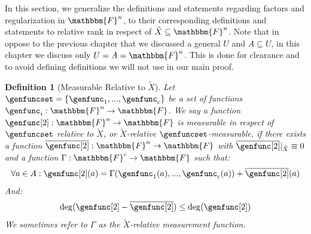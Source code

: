 \documentclass[10pt,a4paper]{article}
\newtheorem{definition}[theorem]{Definition}
\newcommand{\set}[1]{\left\{ #1 \right\}}
\newcommand{\basefield}[0]{\mathbbm{F}}
\newcommand{\blocklength}[0]{n}
\newcommand{\field}[0]{\basefield^{\blocklength}}
\newcommand{\funcdef}[3]{#1:#2\rightarrow#3}
\newcommand{\restrictfunc}[2]{#1|_{#2}}
\newcommand{\relativeremainder}[1]{\overline{#1}}
\newcommand{\variety}{{\tilde{X}}}
\begin{document}
In this section, we generalize the definitions and statements regarding factors and regularization in $\field$,
to their corresponding definitions and statements to relative rank in respect of $\variety \subseteq \field$.
\newline
Note that in oppose to the previous chapter that we discussed a general $U$ and $A \subseteq U$,
in this chapter we discuss only $U = A = \field$.
This is done for clearance and to avoid defining definitions we will not use in our main proof.
\begin{definition}[Measurable Relative to $\variety$]
    Let $\genfuncset = \set{\genfunc_1,...,\genfunc_c}$ be a set of functions $\funcdef{\genfunc_i}{\field}{\basefield}$.
    We say a function $\funcdef{\genfunc[2]}{\field}{\basefield}$ is \emph{measurable in respect of $\genfuncset$ relative to $\variety$},
    or \emph{$\variety$-relative $\genfuncset$-measurable},
    if there exists a function $\funcdef{\relativeremainder{\genfunc[2]}}{\field}{\basefield}$ with $\restrictfunc{\relativeremainder{\genfunc[2]}}{\variety} \equiv 0$
    and a function $\funcdef{\Gamma}{\basefield^c}{\basefield}$ such that:
    \[
        \forall a \in A: \genfunc[2](a) = \Gamma(\genfunc_1(a),...,\genfunc_c(a)) + \relativeremainder{\genfunc[2]}(a)
    \]
    And:
    \[
        \deg(\genfunc[2] - \relativeremainder{\genfunc[2]}) \leq \deg(\genfunc[2])
    \]
    We sometimes refer to $\Gamma$ as the \emph{$\variety$-relative measurement function}.
\end{definition}
\end{document}
